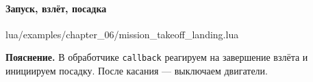 \paragraph{Запуск, взлёт, посадка}
\begin{codefile}{lua/examples/chapter_06/mission_takeoff_landing.lua}
\end{codefile}
\textbf{Пояснение.} В обработчике \texttt{callback} реагируем на завершение взлёта и инициируем посадку. После касания — выключаем двигатели.
